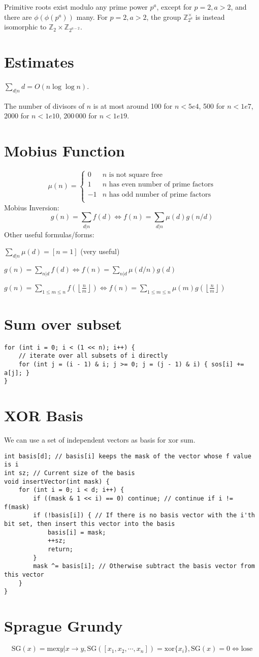 	Primitive roots exist modulo any prime power $p^a$, except for $p = 2, a > 2$, and there are $\phi(\phi(p^a))$ many.
	For $p = 2, a > 2$, the group $\mathbb Z_{2^a}^\times$ is instead isomorphic to $\mathbb Z_2 \times \mathbb Z_{2^{a-2}}$.

\section{Estimates}
	$\sum_{d|n} d = O(n \log \log n)$.

	The number of divisors of $n$ is at most around 100 for $n < 5e4$, 500 for $n < 1e7$, 2000 for $n < 1e10$, 200\,000 for $n < 1e19$.

	\section{Mobius Function}
	\[
		\mu(n) = \begin{cases} 0 & n \textrm{ is not square free}\\ 1 & n \textrm{ has even number of prime factors}\\ -1 & n \textrm{ has odd number of prime factors}\\\end{cases}
	\]
	  Mobius Inversion:
	  \[ g(n) = \sum_{d|n} f(d) \Leftrightarrow f(n) = \sum_{d|n} \mu(d)g(n/d) \]
	  Other useful formulas/forms:
	
	  $ \sum_{d | n} \mu(d) = [ n = 1] $ (very useful)
	
	  $ g(n) = \sum_{n|d} f(d) \Leftrightarrow f(n) = \sum_{n|d} \mu(d/n)g(d)$
	
	 $ g(n) = \sum_{1 \leq m \leq n} f(\left\lfloor\frac{n}{m}\right \rfloor ) \Leftrightarrow f(n) = \sum_{1\leq m\leq n} \mu(m)g(\left\lfloor\frac{n}{m}\right\rfloor)$
	
\section{Sum over subset}
\begin{lstlisting}
for (int i = 0; i < (1 << n); i++) {
	// iterate over all subsets of i directly
	for (int j = (i - 1) & i; j >= 0; j = (j - 1) & i) { sos[i] += a[j]; }
}
\end{lstlisting}
\section{XOR Basis}
We can use a set of independent vectors as basis for xor sum.
\begin{lstlisting}
int basis[d]; // basis[i] keeps the mask of the vector whose f value is i
int sz; // Current size of the basis
void insertVector(int mask) {
	for (int i = 0; i < d; i++) {
		if ((mask & 1 << i) == 0) continue; // continue if i != f(mask)
		if (!basis[i]) { // If there is no basis vector with the i'th bit set, then insert this vector into the basis
			basis[i] = mask;
			++sz;
			return;
		}
		mask ^= basis[i]; // Otherwise subtract the basis vector from this vector
	}
}
\end{lstlisting}
\section{Sprague Grundy}
\[
	\textrm{SG}(x) = \textrm{mex}{y|x\to y}, \textrm{SG}([x_1, x_2, \cdots, x_n]) = \textrm{xor}\{x_i\},\textrm{SG}(x)=0 \iff \textrm{lose}
\]
	   

